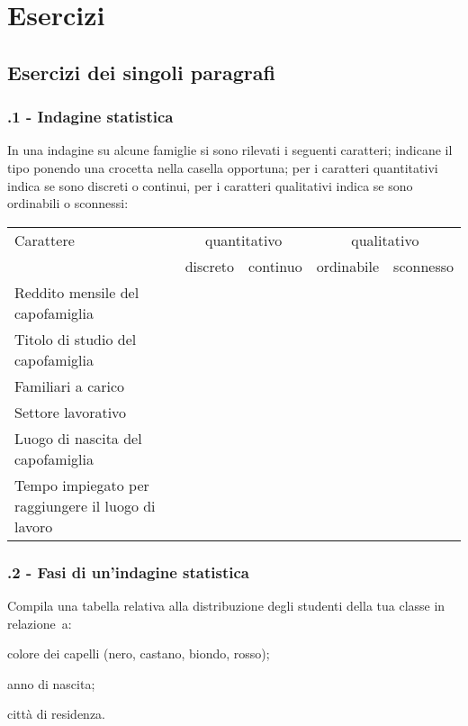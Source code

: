 
\section{Esercizi}
\subsection{Esercizi dei singoli paragrafi}
\subsubsection*{\thechapter.1 - Indagine statistica}

\begin{esercizio}
\label{ese:A.1}
In una indagine su alcune famiglie si sono rilevati i seguenti caratteri; indicane il tipo ponendo una crocetta nella casella
opportuna; per i caratteri quantitativi indica se sono discreti o continui, per i caratteri qualitativi indica se sono ordinabili o sconnessi:

\begin{center}
 \begin{tabularx}{.95\textwidth}{p{5.5cm}cccc}
\toprule
Carattere & \multicolumn{2}{c}{quantitativo} & \multicolumn{2}{c}{qualitativo}\\
 & discreto & continuo & ordinabile & sconnesso\\
\midrule
Reddito mensile del capofamiglia & & & & \\
Titolo di studio del capofamiglia & & & & \\
Familiari a carico & & & & \\
Settore lavorativo & & & & \\
Luogo di nascita del capofamiglia & & & & \\
Tempo impiegato per raggiungere il luogo di lavoro & & & & \\
\bottomrule
\end{tabularx}
\end{center}
\end{esercizio}

\subsubsection*{\thechapter.2 - Fasi di un'indagine statistica}

\begin{esercizio}
\label{ese:A.2}
Compila una tabella relativa alla distribuzione degli studenti della tua classe in relazione~a:
\begin{itemize*}
\item colore dei capelli (nero, castano, biondo, rosso);
\item anno di nascita;
\item città di residenza.
\end{itemize*}
\end{esercizio}

